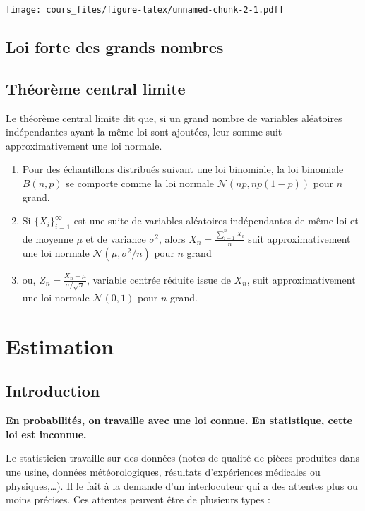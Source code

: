\documentclass[]{book}
\theoremstyle{definition}
\theoremstyle{definition}
\theoremstyle{remark}
\begin{document}
\texttt{[image: cours\_files/figure-latex/unnamed-chunk-2-1.pdf]}

\section{Loi forte des grands
nombres}\label{loi-forte-des-grands-nombres}

\section{Théorème central limite}\label{theoreme-central-limite}

Le théorème central limite dit que, si un grand nombre de variables
aléatoires indépendantes ayant la même loi sont ajoutées, leur somme
suit approximativement une loi normale.

\begin{enumerate}
\def\labelenumi{\arabic{enumi}.}
\item
  Pour des échantillons distribués suivant une loi binomiale, la loi
  binomiale \(B(n,p)\) se comporte comme la loi normale
  \(\mathcal N(np,np(1-p))\) pour \(n\) grand.
\item
  Si \(\{X_i\}_{i=1}^{\infty}\) est une suite de variables aléatoires
  indépendantes de même loi et de moyenne \(\mu\) et de variance
  \(\sigma^2\), alors
  \(\bar X_n=\frac{\displaystyle \sum_{i=1}^nX_i}{n}\) suit
  approximativement une loi normale \(\mathcal N(\mu,\sigma^2/n)\) pour
  \(n\) grand
\item
  ou, \(Z_n=\frac{\bar X_n-\mu}{\sigma/\sqrt{n}}\), variable centrée
  réduite issue de \(\bar X_n\), suit approximativement une loi normale
  \(\mathcal N(0,1)\) pour \(n\) grand.
\end{enumerate}

\chapter{Estimation}\label{estimation}

\section{Introduction}\label{introduction}

\textbf{En probabilités, on travaille avec une loi connue. En
statistique, cette loi est inconnue.}

Le statisticien travaille sur des données (notes de qualité de pièces
produites dans une usine, données météorologiques, résultats
d'expériences médicales ou physiques,\ldots{}). Il le fait à la demande
d'un interlocuteur qui a des attentes plus ou moins précises. Ces
attentes peuvent être de plusieurs types :
\end{document}
